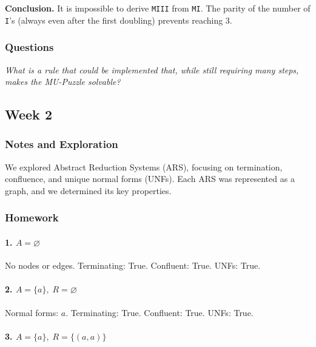 \documentclass[11pt]{article}
\newcommand{\ARSnode}[1]{%
  \node[circle,draw,minimum size=7mm,inner sep=0pt] (#1) {$#1$};%
}
\begin{document}
\textbf{Conclusion.}  
It is impossible to derive \texttt{MIII} from \texttt{MI}.  
The parity of the number of \texttt{I}'s (always even after the first doubling) prevents reaching 3.

\subsubsection{Questions}
\emph{What is a rule that could be implemented that, while still requiring many steps, makes the MU-Puzzle solvable?}

\subsection{Week 2}

\subsubsection{Notes and Exploration}
We explored Abstract Reduction Systems (ARS), focusing on termination, confluence, and unique normal forms (UNFs). 
Each ARS was represented as a graph, and we determined its key properties.

\subsubsection{Homework}
\paragraph{1.\; $A=\varnothing$}
No nodes or edges.  
Terminating: True. Confluent: True. UNFs: True.

\paragraph{2.\; $A=\{a\},\; R=\varnothing$}

Normal forms: $a$. Terminating: True. Confluent: True. UNFs: True.

\paragraph{3.\; $A=\{a\},\; R=\{(a,a)\}$}
\end{document}

